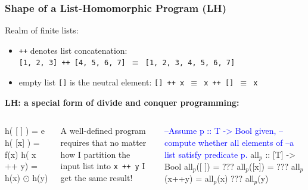 \documentclass{beamer}
\newcommand{\blue}[1]{\textcolor{Blue}{{#1}}}
\newcommand{\emp}[1]{\textcolor{DikuRed}{ #1}}
\newcommand{\mymath}[1]{$ #1 $}
\newcommand{\myindx}[1]{_{#1}}
\begin{document}
\begin{frame}[fragile,t]
\frametitle{Shape of a List-Homomorphic Program (LH)}

Realm of finite lists:
\begin{itemize}
    \item {\tt ++} denotes list concatenation:\\
    {\tt [1, 2, 3] ++ [4, 5, 6, 7] $\equiv$ [1, 2, 3, 4, 5, 6, 7]}
    \item empty list {\tt []} is the neutral element:
        {\tt [] ++ x $\equiv$ x ++ [] $\equiv$ x}
\end{itemize}
\bigskip

\emp{\bf LH: a special form of divide and conquer programming:}
\begin{columns}
\begin{colorcode}[fontsize=\small]
h( [ ] )   = e
h( [x] )   = f(x)
h( x ++ y) = h(x) \mymath{\odot} h(y)
\end{colorcode}
\alert{A well-defined program requires that no matter how 
I partition the input list into {\tt x ++ y} I get the same result!}
\begin{colorcode}[fontsize=\small]
\blue{--Assume p :: T -> Bool given,}
\blue{--compute whether all elements of}
\blue{--a list satisfy predicate p.}
all\mymath{\myindx{p}} :: [T] -> Bool
all\mymath{\myindx{p}}([ ])  = \alert{???}
all\mymath{\myindx{p}}([x])  = \alert{???} 
all\mymath{\myindx{p}}(x++y) = all\mymath{\myindx{p}}(x) \alert{???} all\mymath{\myindx{p}}(y)
\end{colorcode}
\end{columns}

\end{frame}
\end{document}
